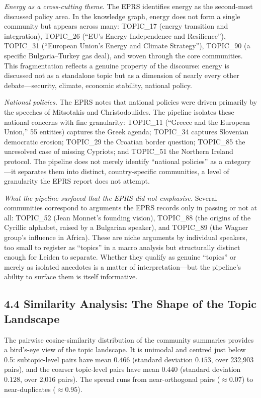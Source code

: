 \documentclass[11pt]{article}
\begin{document}
\emph{Energy as a cross-cutting theme.} The EPRS identifies energy as the second-most discussed policy area. In the knowledge graph, energy does not form a single community but appears across many: TOPIC\_17 (energy transition and integration), TOPIC\_26 (``EU's Energy Independence and Resilience''), TOPIC\_31 (``European Union's Energy and Climate Strategy''), TOPIC\_90 (a specific Bulgaria--Turkey gas deal), and woven through the core communities. This fragmentation reflects a genuine property of the discourse: energy is discussed not as a standalone topic but as a dimension of nearly every other debate---security, climate, economic stability, national policy.

\emph{National policies.} The EPRS notes that national policies were driven primarily by the speeches of Mitsotakis and Christodoulides. The pipeline isolates these national concerns with fine granularity: TOPIC\_11 (``Greece and the European Union,'' 55 entities) captures the Greek agenda; TOPIC\_34 captures Slovenian democratic erosion; TOPIC\_29 the Croatian border question; TOPIC\_85 the unresolved case of missing Cypriots; and TOPIC\_51 the Northern Ireland protocol. The pipeline does not merely identify ``national policies'' as a category---it separates them into distinct, country-specific communities, a level of granularity the EPRS report does not attempt.

\emph{What the pipeline surfaced that the EPRS did not emphasise.} Several communities correspond to arguments the EPRS records only in passing or not at all: TOPIC\_52 (Jean Monnet's founding vision), TOPIC\_88 (the origins of the Cyrillic alphabet, raised by a Bulgarian speaker), and TOPIC\_89 (the Wagner group's influence in Africa). These are niche arguments by individual speakers, too small to register as ``topics'' in a macro analysis but structurally distinct enough for Leiden to separate. Whether they qualify as genuine ``topics'' or merely as isolated anecdotes is a matter of interpretation---but the pipeline's ability to surface them is itself informative.

\subsection{4.4 Similarity Analysis: The Shape of the Topic Landscape}

The pairwise cosine-similarity distribution of the community summaries provides a bird's-eye view of the topic landscape. It is unimodal and centred just below 0.5: subtopic-level pairs have mean $0.466$ (standard deviation $0.153$, over 232{,}903 pairs), and the coarser topic-level pairs have mean $0.440$ (standard deviation $0.128$, over 2{,}016 pairs). The spread runs from near-orthogonal pairs ($\approx 0.07$) to near-duplicates ($\approx 0.95$).
\end{document}
